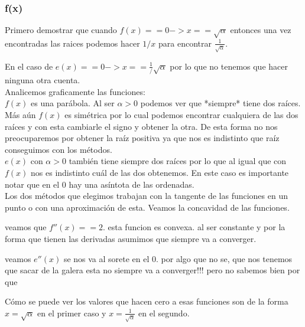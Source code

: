 \documentclass[10pt,a4paper]{article}
\begin{document}
\subsubsection{f(x)}

Primero demostrar que cuando $f(x) == 0 -> x == \sqrt{\alpha}$
entonces una vez encontradas las raices podemos hacer $1/x$ para encontrar
$\displaystyle\frac{1}{\sqrt{\alpha}}$.

En el caso de $\displaystyle e(x) == 0 -> x == \frac{1}/{\sqrt{\alpha}}$ por lo que no tenemos que hacer
ninguna otra cuenta.\\

Analicemos graficamente las funciones:\\


$f(x)$ es una parábola. Al ser $\alpha > 0$ podemos ver que *siempre* tiene dos
raíces. Más aún $f(x)$ es simétrica por lo cual podemos encontrar cualquiera de
las dos raíces y con esta cambiarle el signo y obtener la otra. De esta forma
no nos preocuparemos por obtener la raíz positiva ya que nos es indistinto que
raíz conseguimos con los métodos.\\


$e(x)$ con $\alpha > 0$ también tiene siempre dos raíces por lo que al igual que con
$f(x)$ nos es indistinto cuál de las dos obtenemos. En este caso es importante
notar que en el 0 hay una asíntota de las ordenadas.\\
 
Los dos métodos que elegimos trabajan con la tangente de las funciones en un
punto o con una aproximación de esta. Veamos la concavidad de las funciones.




veamos que $f''(x) == 2$. esta funcion es convexa. al ser constante y por la
forma que tienen las derivadas asumimos que siempre va a converger.

veamos $e''(x)$ se nos va al sorete en el 0. por algo que no se, que nos tenemos
que sacar de la galera esta no siempre va a converger!!! pero no sabemos bien
por que


Cómo se puede ver los valores que hacen cero a esas funciones son de la forma
$x = \sqrt{\alpha}$ en el primer caso y $x = \frac{1}{\sqrt{\alpha}}$ en el
segundo.
\end{document}
